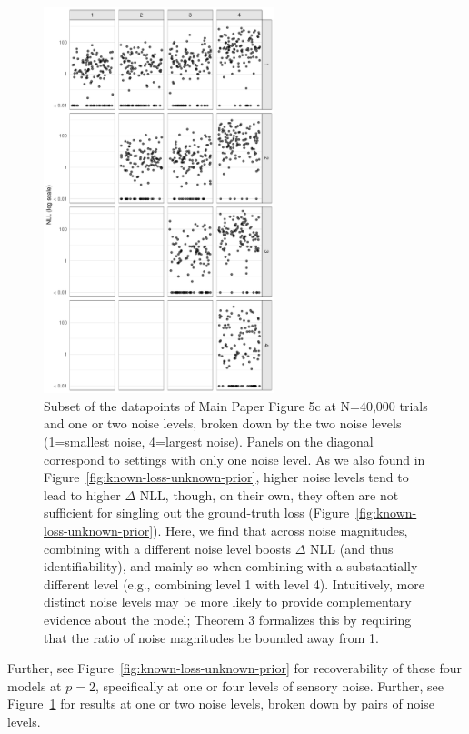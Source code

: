 \documentclass[si.tex]{subfiles}
\begin{document}
\begin{figure}
\centering
\includegraphics[width=0.6\textwidth]{../code/output/images/sensory_LVL_dotplots.pdf}

\caption{
Subset of the datapoints of Main Paper Figure 5c at N=40,000 trials and one or two noise levels, broken down by the two noise levels (1=smallest noise, 4=largest noise).
Panels on the diagonal correspond to settings with only one noise level.
As we also found in Figure~\ref{fig:known-loss-unknown-prior}, higher noise levels tend to lead to higher $\Delta$ NLL, though, on their own, they often are not sufficient for singling out the ground-truth loss (Figure~\ref{fig:known-loss-unknown-prior}).
Here, we find that across noise magnitudes, combining with a different noise level boosts $\Delta$ NLL (and thus identifiability), and mainly so when combining with a substantially different level (e.g., combining level 1 with level 4).
Intuitively, more distinct noise levels may be more likely to provide complementary evidence about the model; Theorem 3 formalizes this by requiring that the ratio of noise magnitudes be bounded away from 1.
}\label{fig:by-pair-plot}
\end{figure}

Further, see Figure~\ref{fig:known-loss-unknown-prior} for recoverability of these four models at $p=2$, specifically at one or four levels of sensory noise.
Further, see Figure~\ref{fig:by-pair-plot} for results at one or two noise levels, broken down by pairs of noise levels.
\end{document}
